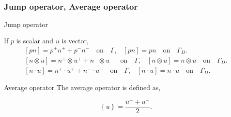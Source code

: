 \documentclass{beamer}
\begin{document}


\begin{frame}
\frametitle{Jump operator, Average operator}

\begin{block}{Jump operator}

If $p$ is scalar and $u$ is vector,
\begin{equation}
\begin{split}
[pn] = p^+ n^+ + p^- n^- \quad \textrm{on} \quad \Gamma \textrm{,} \quad [pn] = p n \quad \textrm{on} \quad \Gamma_D \textrm{.}\\
[n \otimes u] = n^+ \otimes u^+ + n^- \otimes u^- \quad \textrm{on} \quad \Gamma \textrm{,} \quad [n \otimes u] = n \otimes u \quad \textrm{on} \quad \Gamma_D \textrm{.}\\
[n \cdot u] = n^+ \cdot u^+ + n^- \cdot u^- \quad \textrm{on} \quad \Gamma \textrm{,} \quad [n \cdot u] = n \cdot u \quad \textrm{on} \quad \Gamma_D  \textrm{.}
\end{split}
\end{equation}
\end{block}

\begin{block}{Average operator}
The average operator is defined as,

\begin{equation}\label{average operator}
\left\lbrace u \right\rbrace = \frac{u^+ + u^-}{2} \textrm{.}
\end{equation} 

\end{block}

\end{frame}

\end{document}
